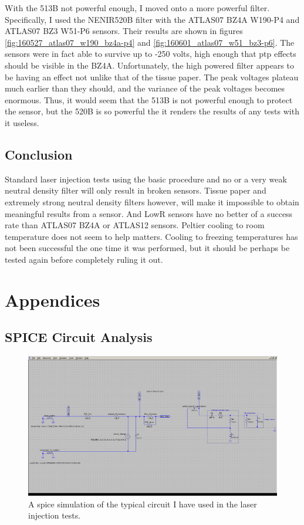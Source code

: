 \documentclass{report}
\begin{document}
            With the 513B not powerful enough, I moved onto a more powerful filter. Specifically, I used the NENIR520B filter with the ATLAS07 BZ4A W190-P4 and ATLAS07 BZ3 W51-P6 sensors. Their results are shown in figures \ref{fig:160527_atlas07_w190_bz4a-p4} and \ref{fig:160601_atlas07_w51_bz3-p6}. The sensors were in fact able to survive up to -250 volts, high enough that ptp effects should be visible in the BZ4A. Unfortunately, the high powered filter appears to be having an effect not unlike that of the tissue paper. The peak voltages plateau much earlier than they should, and the variance of the peak voltages becomes enormous. Thus, it would seem that the 513B is not powerful enough to protect the sensor, but the 520B is so powerful the it renders the results of any tests with it useless.



        \section{Conclusion}
            Standard laser injection tests using the basic procedure and no or a very weak neutral density filter will only result in broken sensors. Tissue paper and extremely strong neutral density filters however, will make it impossible to obtain meaningful results from a sensor. And LowR sensors have no better of a success rate than ATLAS07 BZ4A or ATLAS12 sensors. Peltier cooling to room temperature does not seem to help matters. Cooling to freezing temperatures has not been successful the one time it was performed, but it should be perhaps be tested again before completely ruling it out.
            





    \chapter{Appendices}
        \section{SPICE Circuit Analysis}

            \begin{figure}[h] 
                \includegraphics[height=.4\textheight]{spice_circuit}
                \centering
                \caption{ A spice simulation of the typical circuit I have used in the laser injection tests. }
                \label{fig:spice_circuit}
            \end{figure}
\end{document}
